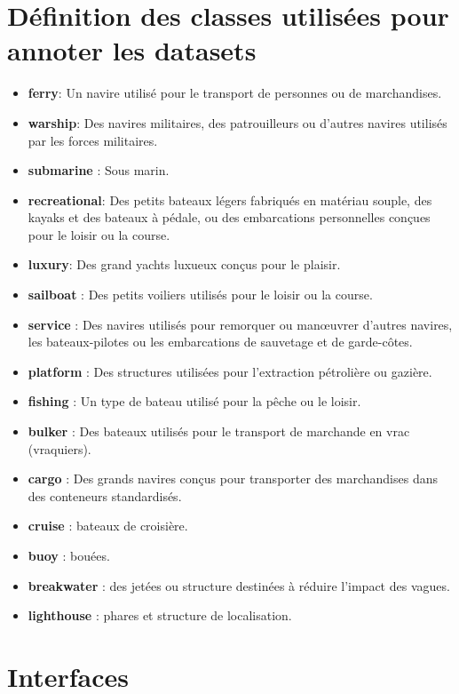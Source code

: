 \pagebreak

\chapter{Définition des classes utilisées pour annoter les datasets}

\begin{itemize}
    \item \textbf{ferry}: Un navire utilisé pour le transport de personnes ou de marchandises.
    \item \textbf{warship}: Des navires militaires, des patrouilleurs ou d'autres navires utilisés par les forces militaires.
    \item \textbf{submarine} : Sous marin.
    \item \textbf{recreational}: Des petits bateaux légers fabriqués en matériau souple, des kayaks et des bateaux à pédale, ou des embarcations personnelles conçues pour le loisir ou la course.
    \item \textbf{luxury}: Des grand yachts luxueux conçus pour le plaisir.
    \item \textbf{sailboat} : Des petits voiliers utilisés pour le loisir ou la course.
    \item \textbf{service} : Des navires utilisés pour remorquer ou manœuvrer d'autres navires, les bateaux-pilotes ou les embarcations de sauvetage et de garde-côtes.
    \item \textbf{platform} : Des structures utilisées pour l'extraction pétrolière ou gazière.
    \item \textbf{fishing} : Un type de bateau utilisé pour la pêche ou le loisir.
    \item \textbf{bulker} : Des bateaux utilisés pour le transport de marchande en vrac (vraquiers).
    \item \textbf{cargo} : Des grands navires conçus pour transporter des marchandises dans des conteneurs standardisés.
    \item \textbf{cruise} : bateaux de croisière.
    \item \textbf{buoy} : bouées.
    \item \textbf{breakwater} : des jetées ou structure destinées à réduire l'impact des vagues.
    \item \textbf{lighthouse} : phares et structure de localisation.
\end{itemize}
\label{classes_annotations}

\pagebreak

\chapter{Interfaces}

